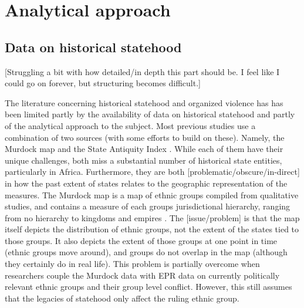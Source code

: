 \section{Analytical approach} \label{Analytical approach}


\subsection{Data on historical statehood} \label{Data on historical statehood}






[Struggling a bit with how detailed/in depth this part should be. I feel like I
could go on forever, but structuring becomes difficult.]

The literature concerning historical statehood and organized violence has has
been limited partly by the availability of data on historical statehood and
partly of the analytical approach to the subject. Most previous studies use a
combination of two sources (with some efforts to build on these). Namely, the
Murdock map \citep{Murdock1967} and the State Antiquity Index
\citep{Bockstette2012}. While each of them have their unique challenges, both
miss a substantial number of historical state entities, particularly in Africa.
Furthermore, they are both [problematic/obscure/in-direct] in how the past
extent of states relates to the geographic representation of the measures. The
Murdock map is a map of ethnic groups compiled from qualitative studies, and
contains a measure of each groups jurisdictional hierarchy, ranging from no
hierarchy to kingdoms and empires \citep{Murdock1967}. The [issue/problem] is
that the map itself depicts the distribution of ethnic groups, not the extent of
the states tied to those groups. It also depicts the extent of those groups at
one point in time (ethnic groups move around), and groups do not overlap in the
map (although they certainly do in real life). This problem is partially
overcome when researchers couple the Murdock data with EPR data on currently
politically relevant ethnic groups and their group level conflict. However, this
still assumes that the legacies of statehood only affect the ruling ethnic
group.

